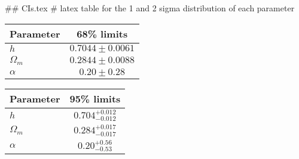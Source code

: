 ## CIs.tex
# latex table for the 1 and 2 sigma distribution of each parameter

\begin{tabular} { l  c}
 Parameter &  68\% limits\\
\hline
{\boldmath$h              $} & $0.7044\pm 0.0061          $\\
{\boldmath$\Omega_m       $} & $0.2844\pm 0.0088          $\\
{\boldmath$\alpha         $} & $0.20\pm 0.28              $\\
\hline
\end{tabular}

\begin{tabular} { l  c}
 Parameter &  95\% limits\\
\hline
{\boldmath$h              $} & $0.704^{+0.012}_{-0.012}   $\\
{\boldmath$\Omega_m       $} & $0.284^{+0.017}_{-0.017}   $\\
{\boldmath$\alpha         $} & $0.20^{+0.56}_{-0.53}      $\\
\hline
\end{tabular}
